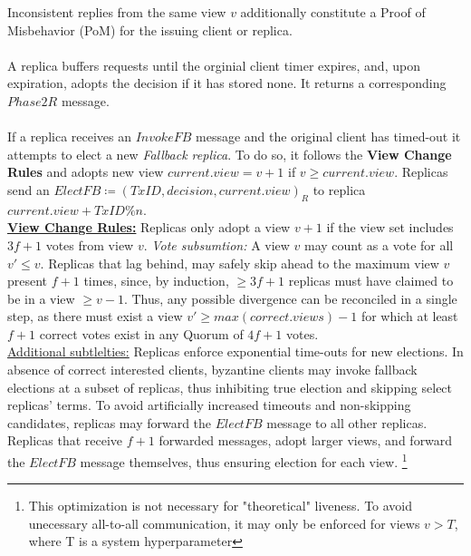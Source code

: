 Inconsistent replies from the same view $v$ additionally constitute a Proof of Misbehavior (PoM) for the issuing client or replica. \\
\\
A replica buffers requests until the orginial client timer expires, and, upon expiration, adopts the decision if it has stored none. It returns a corresponding $Phase2R$ message. \\
\\
If a replica receives an $InvokeFB$ message and the original client has timed-out it attempts to elect a new \textit{Fallback replica}. To do so, it follows the \textbf{View Change Rules} and adopts new view $current.view = v+1$ if $v \geq current.view$. 
Replicas send an $ElectFB \coloneqq (TxID, decision, current.view)_R$ to replica $current.view + TxID \% n$. \\
\underline{\textbf{View Change Rules:}} \one Replicas only adopt a view $v+1$ if the view set includes $3f+1$ votes from view $v$. \textit{Vote subsumtion:} A view $v$ may count as a vote for all $v' \leq v$. \two Replicas that lag behind, may safely skip ahead to the maximum view $v$ present $f+1$ times, since, by induction, $\geq 3f+1$ replicas must have claimed to be in a view $\geq v-1$. Thus, any possible divergence can be reconciled in a single step, as there must exist a view $v' \geq max(correct.views) -1 $ for which at least $f+1$ correct votes exist in any Quorum of $4f+1$ votes.\\
\underline{Additional subtlelties:} Replicas enforce exponential time-outs for new elections. In absence of correct interested clients, byzantine clients may invoke fallback elections at a subset of replicas, thus inhibiting true election and skipping select replicas' terms. To avoid artificially increased timeouts and non-skipping candidates, replicas may forward the $ElectFB$ message to all other replicas. Replicas that receive $f+1$ forwarded messages, adopt larger views, and forward the $ElectFB$ message themselves, thus ensuring election for each view.
\footnote{This optimization is not necessary for "theoretical" liveness. To avoid unecessary all-to-all communication, it may only be enforced for views $v > T$, where T is a system hyperparameter }\\
